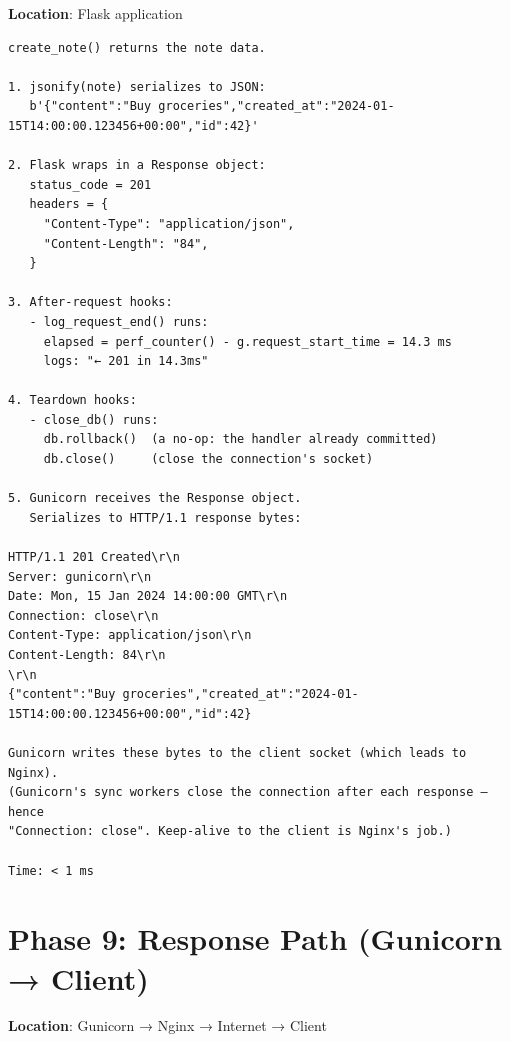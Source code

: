 \textbf{Location}: Flask application

\begin{outputbox}
\begin{Verbatim}[fontsize=\codesize, breaklines, breakanywhere, breaksymbolleft={\tiny\textcolor{muted}{$\hookrightarrow$}}]
create_note() returns the note data.

1. jsonify(note) serializes to JSON:
   b'{"content":"Buy groceries","created_at":"2024-01-15T14:00:00.123456+00:00","id":42}'

2. Flask wraps in a Response object:
   status_code = 201
   headers = {
     "Content-Type": "application/json",
     "Content-Length": "84",
   }

3. After-request hooks:
   - log_request_end() runs:
     elapsed = perf_counter() - g.request_start_time = 14.3 ms
     logs: "← 201 in 14.3ms"

4. Teardown hooks:
   - close_db() runs:
     db.rollback()  (a no-op: the handler already committed)
     db.close()     (close the connection's socket)

5. Gunicorn receives the Response object.
   Serializes to HTTP/1.1 response bytes:

HTTP/1.1 201 Created\r\n
Server: gunicorn\r\n
Date: Mon, 15 Jan 2024 14:00:00 GMT\r\n
Connection: close\r\n
Content-Type: application/json\r\n
Content-Length: 84\r\n
\r\n
{"content":"Buy groceries","created_at":"2024-01-15T14:00:00.123456+00:00","id":42}

Gunicorn writes these bytes to the client socket (which leads to Nginx).
(Gunicorn's sync workers close the connection after each response — hence
"Connection: close". Keep-alive to the client is Nginx's job.)

Time: < 1 ms
\end{Verbatim}
\end{outputbox}

\setcounter{section}{9}
\section{Phase 9: Response Path (Gunicorn → Client)}\label{29-client-server-journey:2910-phase-9-response-path-gunicorn--client}

\textbf{Location}: Gunicorn → Nginx → Internet → Client

